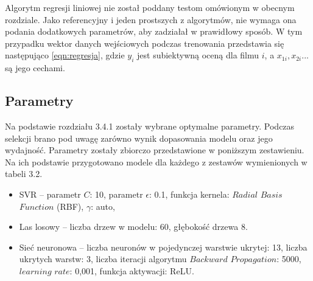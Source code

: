 \vspace{5mm}

Algorytm regresji liniowej nie został poddany testom omówionym w obecnym rozdziale. Jako referencyjny i jeden prostszych z algorytmów, nie wymaga ona podania dodatkowych parametrów, aby zadziałał w prawidłowy sposób. W tym przypadku wektor danych wejściowych podczas trenowania przedstawia się  następująco \ref{eqn:regresja}, gdzie $y_i$ jest subiektywną oceną dla filmu $i$, a $x_{1i}, x_{2i}...$ są jego cechami. 

\vspace{7mm}

\subsection{Parametry}


Na podstawie rozdziału 3.4.1 zostały wybrane optymalne parametry. Podczas selekcji brano pod uwagę zarówno wynik dopasowania modelu oraz jego wydajność. Parametry zostały zbiorczo przedstawione w poniższym zestawieniu. Na ich podstawie przygotowano modele dla każdego z zestawów wymienionych w tabeli 3.2.


\begin{itemize}[label=$\bullet$]
	\item SVR --  parametr $C$: 10, parametr $\epsilon$: 0.1, funkcja kernela:  $Radial$ $Basis$ $Function$ (RBF), $\gamma$: auto, 
	
	\item Las losowy -- liczba drzew w modelu: 60, głębokość drzewa 8. 

	\item Sieć neuronowa -- liczba neuronów w pojedynczej warstwie ukrytej: 13, liczba ukrytych warstw: 3, liczba iteracji algorytmu $Backward$ $Propagation$: 5000, $learning$ $rate$: 0,001, funkcja aktywacji: ReLU.\par 
	
\end{itemize}


